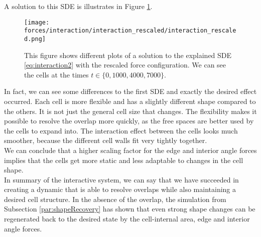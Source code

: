 \documentclass[a4paper,12pt,leqno]{article}
\theoremstyle{plain}
\theoremstyle{remark}
\begin{document}
A solution to this SDE is illustrates in Figure \ref{fig:interaction_rescaled}. 
\begin{figure}[h!]
	\begin{center}
		\texttt{[image: forces/interaction/interaction\_rescaled/interaction\_rescaled.png]}
		\caption{This figure shows different plots of a solution to the explained SDE \eqref{eq:interaction2} with the rescaled force configuration. We can see the cells at the times $t \in \{ 0, 1000, 4000, 7000\}$. }
		\label{fig:interaction_rescaled}
	\end{center}
\end{figure}
In fact, we can see some differences to the first SDE and exactly the desired effect occurred. Each cell is more flexible and has a slightly different shape compared to the others. It is not just the general cell size that changes. The flexibility makes it possible to resolve the overlap more quickly, as the free spaces are better used by the cells to expand into. The interaction effect between the cells looks much smoother, because the different cell walls fit very tightly together. \\
We can conclude that a higher scaling factor for the edge and interior angle forces implies that the cells get more static and less adaptable to changes in the cell shape. \\
In summary of the interactive system, we can say that we have succeeded in creating a dynamic that is able to resolve overlaps while also maintaining a desired cell structure. In the absence of the overlap, the simulation from Subsection \ref{par:shapeRecovery} has shown that even strong shape changes can be regenerated back to the desired state by the cell-internal area, edge and interior angle forces.



\newpage
\end{document}
